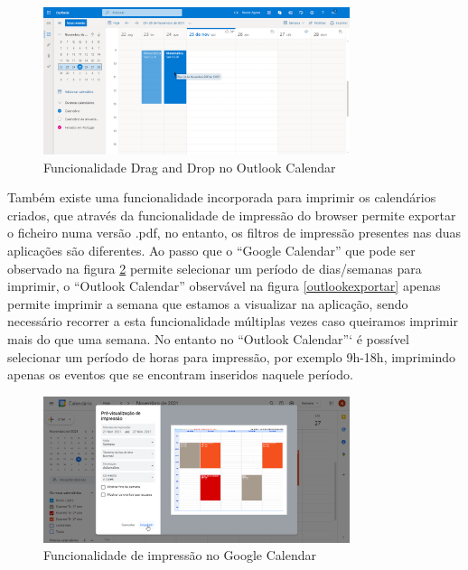 \documentclass[11pt, twoside]{report}
\begin{document}
	\begin{figure}[H] 
		\centering
		\includegraphics[width=0.8\textwidth,height=0.8\textheight,keepaspectratio]{image/estadodearte/drag_drop_outlook}
		\caption{Funcionalidade Drag and Drop no Outlook Calendar}
		\label{outlookdragdrop}
	\end{figure}
	
	Também existe uma funcionalidade incorporada para imprimir os calendários criados, que através da funcionalidade de impressão do browser permite exportar o ficheiro numa versão .pdf, no entanto, os filtros de impressão presentes nas duas aplicações são diferentes. Ao passo que o ``Google Calendar'' que pode ser observado na figura \ref{googleexportar} permite selecionar um período de dias/semanas para imprimir, o ``Outlook Calendar'' observável na figura \ref{outlookexportar} apenas permite imprimir a semana que estamos a visualizar na aplicação, sendo necessário recorrer a esta funcionalidade múltiplas vezes caso queiramos imprimir mais do que uma semana. No entanto no ``Outlook Calendar''` é possível selecionar um período de horas para impressão, por exemplo 9h-18h, imprimindo apenas os eventos que se encontram inseridos naquele período.
	
	\begin{figure}[H] 
		\centering
		\includegraphics[width=0.8\textwidth,height=0.8\textheight,keepaspectratio]{image/estadodearte/imprimir_google}
		\caption{Funcionalidade de impressão no Google Calendar}
		\label{googleexportar}
	\end{figure}
	
\end{document}
